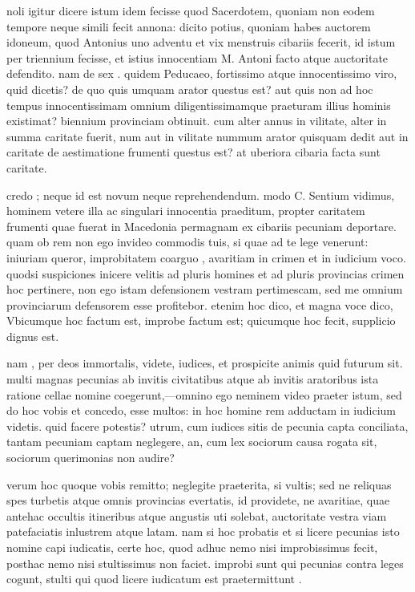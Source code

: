  noli igitur dicere istum idem fecisse quod Sacerdotem, quoniam non eodem tempore neque simili fecit annona: dicito potius, quoniam habes auctorem idoneum, quod Antonius uno adventu et vix menstruis cibariis fecerit, id istum per triennium fecisse, et istius innocentiam M. Antoni facto atque auctoritate defendito. nam de sex . quidem Peducaeo, fortissimo atque innocentissimo viro, quid dicetis? de quo quis umquam arator questus est? aut quis non ad hoc tempus innocentissimam omnium diligentissimamque praeturam illius hominis existimat? biennium provinciam obtinuit. cum alter annus in vilitate, alter in summa caritate fuerit, num aut in vilitate nummum arator quisquam dedit aut in caritate de aestimatione frumenti questus est? at uberiora cibaria facta sunt caritate.

 credo ; neque id est novum neque reprehendendum. modo C. Sentium vidimus, hominem vetere illa ac singulari innocentia praeditum, propter caritatem frumenti quae fuerat in Macedonia permagnam ex cibariis pecuniam deportare. quam ob rem non ego invideo commodis tuis, si quae ad te lege venerunt: iniuriam queror, improbitatem coarguo , avaritiam in crimen et in iudicium voco. quodsi suspiciones inicere velitis ad pluris homines et ad pluris provincias crimen hoc pertinere, non ego istam defensionem vestram pertimescam, sed me omnium provinciarum defensorem esse profitebor. etenim hoc dico, et magna voce dico, Vbicumque hoc factum est, improbe factum est; quicumque hoc fecit, supplicio dignus est.

 nam , per deos immortalis, videte, iudices, et prospicite animis quid futurum sit. multi magnas pecunias ab invitis civitatibus atque ab invitis aratoribus ista ratione cellae nomine coegerunt,—omnino ego neminem video praeter istum, sed do hoc vobis et concedo, esse multos: in hoc homine rem adductam in iudicium videtis. quid facere potestis? utrum, cum iudices sitis de pecunia capta conciliata, tantam pecuniam captam neglegere, an, cum lex sociorum causa rogata sit, sociorum querimonias non audire?

 verum hoc quoque vobis remitto; neglegite praeterita, si vultis; sed ne reliquas spes turbetis atque omnis provincias evertatis, id providete, ne avaritiae, quae antehac occultis itineribus atque angustis uti solebat, auctoritate vestra viam patefaciatis inlustrem atque latam. nam si hoc probatis et si licere pecunias isto nomine capi iudicatis, certe hoc, quod adhuc nemo nisi improbissimus fecit, posthac nemo nisi stultissimus non faciet. improbi sunt qui pecunias contra leges cogunt, stulti qui quod licere iudicatum est praetermittunt .

